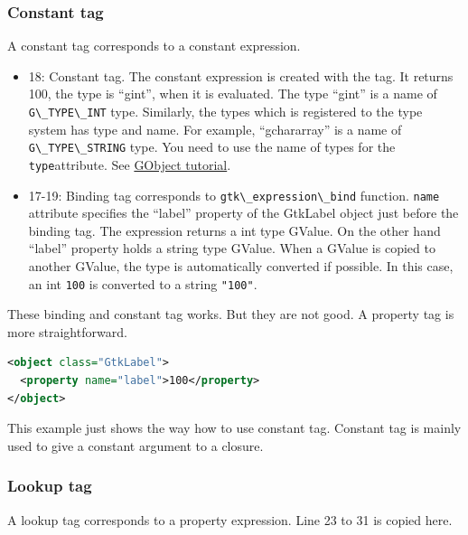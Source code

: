 \hypertarget{constant-tag}{%
\subsubsection{Constant tag}\label{constant-tag}}

A constant tag corresponds to a constant expression.

\begin{itemize}
\tightlist
\item
  18: Constant tag. The constant expression is created with the tag. It
  returns 100, the type is ``gint'', when it is evaluated. The type
  ``gint'' is a name of \passthrough{\lstinline!G\_TYPE\_INT!} type.
  Similarly, the types which is registered to the type system has type
  and name. For example, ``gchararray'' is a name of
  \passthrough{\lstinline!G\_TYPE\_STRING!} type. You need to use the
  name of types for the \passthrough{\lstinline!type!}attribute. See
  \href{https://github.com/ToshioCP/Gobject-tutorial/blob/main/gfm/sec5.md\#gvalue}{GObject
  tutorial}.
\item
  17-19: Binding tag corresponds to
  \passthrough{\lstinline!gtk\_expression\_bind!} function.
  \passthrough{\lstinline!name!} attribute specifies the ``label''
  property of the GtkLabel object just before the binding tag. The
  expression returns a int type GValue. On the other hand ``label''
  property holds a string type GValue. When a GValue is copied to
  another GValue, the type is automatically converted if possible. In
  this case, an int \passthrough{\lstinline!100!} is converted to a
  string \passthrough{\lstinline!"100"!}.
\end{itemize}

These binding and constant tag works. But they are not good. A property
tag is more straightforward.

\begin{lstlisting}[language=XML]
<object class="GtkLabel">
  <property name="label">100</property>
</object>
\end{lstlisting}

This example just shows the way how to use constant tag. Constant tag is
mainly used to give a constant argument to a closure.

\hypertarget{lookup-tag}{%
\subsubsection{Lookup tag}\label{lookup-tag}}

A lookup tag corresponds to a property expression. Line 23 to 31 is
copied here.


